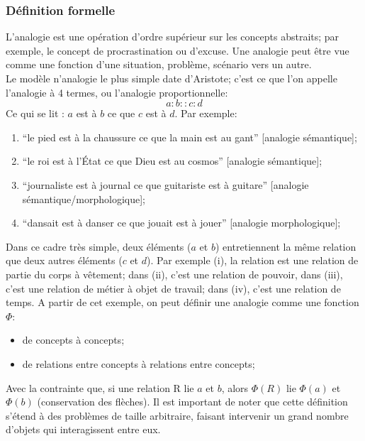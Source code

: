 \documentclass[french]{article}
\begin{document}
			\subsubsection{Définition formelle}
			L'analogie est une opération d'ordre supérieur sur les concepts abstraits; par exemple, le concept de procrastination ou d'excuse. Une analogie peut être vue comme une fonction d'une situation, problème, scénario vers un autre.\\
			Le modèle n'analogie le plus simple date d'Aristote; c'est ce que l'on appelle l'analogie à 4 termes, ou l'analogie proportionnelle:
			\begin{equation}
			a:b::c:d
			\end{equation}
			Ce qui se lit : $a$ est à $b$ ce que $c$ est à $d$. Par exemple:
			\begin{enumerate}[label=(\roman*)]
				\item ``le pied est à la chaussure ce que la main est au gant'' [analogie sémantique];
				\item ``le roi est à l’État ce que Dieu est au cosmos'' [analogie sémantique];
				\item ``journaliste est à journal ce que guitariste est à guitare'' [analogie sémantique/morphologique];
				\item ``dansait est à danser ce que jouait est à jouer'' [analogie morphologique];
			\end{enumerate}
			Dans ce cadre très simple, deux éléments ($a$ et $b$) entretiennent la même relation que deux autres éléments ($c$ et $d$). Par exemple (i), la relation est une relation de partie du corps à vêtement; dans (ii), c'est une relation de pouvoir, dans (iii), c'est une relation de métier à objet de travail; dans (iv), c'est une relation de temps. A partir de cet exemple, on peut définir une analogie comme une fonction $\Phi$:
			\begin{itemize}
				\item de concepts à concepts;
				\item de relations entre concepts à relations entre concepts;
			\end{itemize}
			Avec la contrainte que, si une relation R lie $a$ et $b$, alors $\Phi(R)$ lie $\Phi(a)$ et $\Phi(b)$ (conservation des flèches). Il est important de noter que cette définition s'étend à des problèmes de taille arbitraire, faisant intervenir un grand nombre d'objets qui interagissent entre eux. \\
\end{document}
